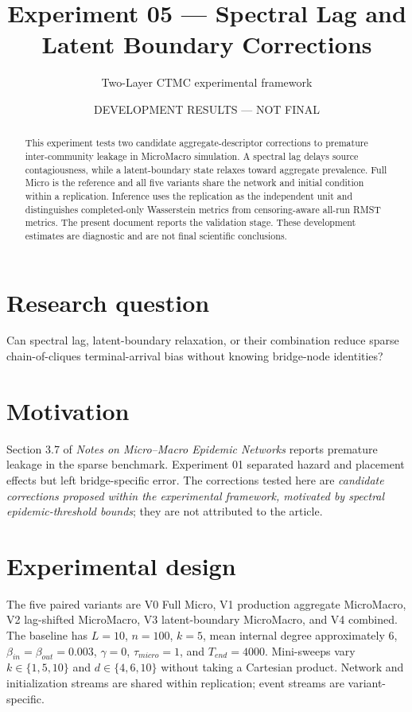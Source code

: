 \documentclass[11pt]{article}
\title{Experiment 05 --- Spectral Lag and Latent Boundary Corrections}
\author{Two-Layer CTMC experimental framework}
\date{DEVELOPMENT RESULTS --- NOT FINAL}
\begin{document}
\maketitle
\begin{center}\end{center}

\begin{abstract}
This experiment tests two candidate aggregate-descriptor corrections to premature
inter-community leakage in MicroMacro simulation.  A spectral lag delays source
contagiousness, while a latent-boundary state relaxes toward aggregate prevalence.
Full Micro is the reference and all five variants share the network and initial
condition within a replication.  Inference uses the replication as the independent
unit and distinguishes completed-only Wasserstein metrics from censoring-aware
all-run RMST metrics.  The present document reports the validation stage.
These development estimates are diagnostic and are not final scientific conclusions.
\end{abstract}

\section{Research question}
Can spectral lag, latent-boundary relaxation, or their combination reduce sparse
chain-of-cliques terminal-arrival bias without knowing bridge-node identities?

\section{Motivation}
Section 3.7 of \emph{Notes on Micro--Macro Epidemic Networks} reports premature
leakage in the sparse benchmark. Experiment 01 separated hazard and placement
effects but left bridge-specific error. The corrections tested here are
\emph{candidate corrections proposed within the experimental framework, motivated
by spectral epidemic-threshold bounds}; they are not attributed to the article.

\section{Experimental design}
The five paired variants are V0 Full Micro, V1 production aggregate MicroMacro,
V2 lag-shifted MicroMacro, V3 latent-boundary MicroMacro, and V4 combined.
The baseline has $L=10$, $n=100$, $k=5$, mean internal degree approximately 6,
$\beta_{in}=\beta_{out}=0.003$, $\gamma=0$, $\tau_{micro}=1$, and
$T_{end}=4000$. Mini-sweeps vary $k\in\{1,5,10\}$ and
$d\in\{4,6,10\}$ without taking a Cartesian product. Network and initialization
streams are shared within replication; event streams are variant-specific.
\end{document}
